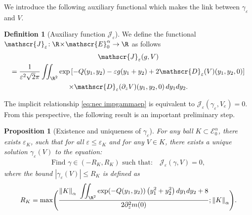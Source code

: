 \documentclass[10pt]{amsart}
\let\mathcal\mathscr
\theoremstyle{plain}
\newtheorem{prop}[thm]{Proposition}
\theoremstyle{definition}
\newtheorem{definition}[thm]{Definition}
\newcommand{\D}{\mathcal{D}_\eps}
\newcommand{\Je}{\mathcal{J}_\eps}
\let\eps\varepsilon
\let\ds\displaystyle
\newcommand{\abs}[1]{\left\lvert#1\right\rvert}
\newcommand{\nalph}[1]{\left\lVert#1\right\rVert_\alpha}
\newcommand{\Eaz}{\mathcal{E}^\alpha_0}
\newcommand{\RK}{R_K}
\begin{document}
We introduce the following auxiliary functional which makes the link between $\gamma_\eps$ and $V$.
\begin{definition}[Auxiliary function $\Je$]
We define the functional \hbox{$\Je\!:\R\!\times\!\Eaz \to \R$} as follows
\begin{multline}\label{eq:def_Jeps}
\Je(g,V)\\
= \dfrac{1}{\eps^2 \sqrt{2}\pi }\iint_{\R^2} \exp\left[-Q(y_1,y_2) - \eps g (y_1+y_2) +2 \D(V)(y_1,y_2,0) \right]\\
\times \D(\partial_z V)(y_1,y_2,0) \, d y_1 d y_2.
\end{multline}
\end{definition}
The implicit relationship \eqref{eq:nec impgammaep} is equivalent to $\Je(\gamma_\eps,V_e) = 0$. From this perspective,
the following result is an important preliminary step.
\begin{prop}[Existence and uniqueness of $\gamma_\eps$]\label{existunique gammaeps}
For any ball $K \subset \Eaz$, there exists $\eps_K$, such that for all $\eps \leq \eps_K$ and for any $V \in K $, there exists a unique solution $\gamma_\eps(V) $ to the equation:
\begin{align*}
\text{Find $\gamma\in (-\RK,\RK)$ such that:} \quad\Je(\gamma,V) = 0,
\end{align*}
where the bound $\abs{\gamma_\eps(V)} \leq \RK$ is defined as
\begin{equation}\label{def G+G-}
\RK= \max \Biggl(\ds \dfrac{\ds \nalph{K} \ \iint _{\R^2} \exp(-Q (y_1,y_2)) \left (y_1^2 + y_2^2 \right) dy_1dy_2 +8}{ 2 \partial_z^2 m(0)} ; \nalph{K} \Biggr).
\end{equation}
\end{prop}
\end{document}
